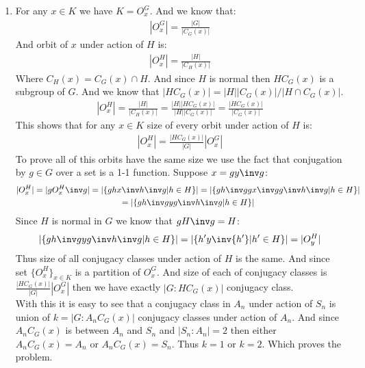 \begin{enumerate}[label=]
    \item
        For any $x \in K$ we have $K = O_x^G$. And we know that:
        \begin{gather*}
            |O_x^G| = \frac{|G| }{|C_G(x)|}
        \end{gather*}
        And orbit of $x$ under action of $H$ is:
        \begin{gather*}
            |O_x^H| = \frac{|H| }{|C_H(x)|}
        \end{gather*}
        Where $C_H(x) = C_G(x) \cap H$. And since $H$ is normal then $HC_G(x)$ is a subgroup of $G$. And we know that $|HC_G(x)| = {|H||C_G(x)| }/{|H \cap C_G(x)|}$.
        \begin{gather*}
            |O_x^H| = \frac{|H| }{|C_H(x)|} = \frac{|H| |HC_G(x)|}{|H||C_G(x)|} = \frac{|HC_G(x)| }{|C_G(x)|}
        \end{gather*}
        This shows that for any $x \in K$ size of every orbit under action of $H$ is:
        \begin{gather*}
            |O_x^H| = \frac{|HC_G(x)| }{|G| } |O_x^G|
        \end{gather*}
        To prove all of this orbits have the same size we use the fact that conjugation by $g \in G$ over a set is a 1-1 function. Suppose $x = gy \inv g$:
        \begin{gather*}
            |O_x^H| = |g O_x^H \inv g| = |\{g hx\inv h \inv g | h \in H\}| = |\{g h \inv g g x \inv g g \inv h \inv g | h \in H\}| \\
            = |\{gh \inv g y g \inv h \inv g | h \in H\}|
        \end{gather*}
        Since $H$ is normal in $G$ we know that $g H \inv g = H$:
        \begin{gather*}
            |\{gh \inv g y g \inv h \inv g | h \in H\}| = |\{h' y \inv{h'} | h' \in H\}| = |O_y^H|
        \end{gather*}
        Thus size of all conjugacy classes under action of $H$ is the same.
        And since set $\{O_x^H\}_{x \in K}$ is a partition of $O_x^G$. And size of each of conjugacy classes is $\frac{|HC_G(x)| }{|G| } |O_x^G|$ then we have exactly
        $|G: HC_G(x)|$ conjugacy class. \\
        With this it is easy to see that a conjugacy class in $A_n$ under action of $S_n$ is union of $k = |G: A_n C_G(x)|$ conjugacy classes under action of $A_n$.
        And since $A_nC_G(x)$ is between $A_n$ and $S_n$ and $|S_n:A_n| = 2$ then either $A_nC_G(x) = A_n$ or $A_nC_G(x) = S_n$. Thus $k = 1$ or $k = 2$. Which proves the problem.
\end{enumerate}
